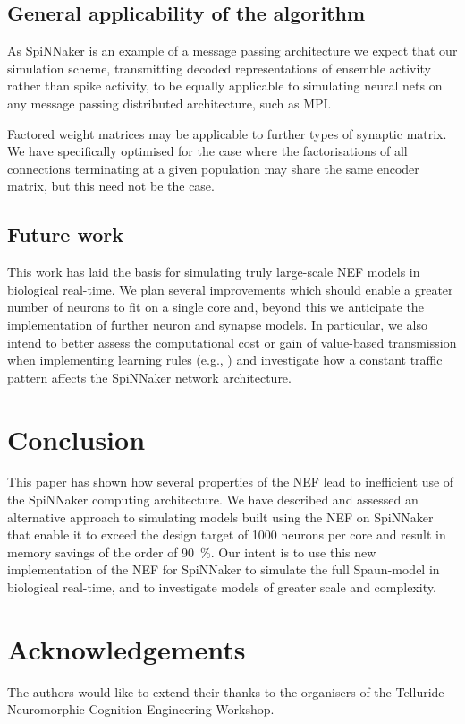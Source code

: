 \documentclass[conference]{IEEEtran}
\begin{document}
  \subsection{General applicability of the algorithm}

  As SpiNNaker is an example of a message passing architecture we expect that our simulation scheme, transmitting decoded representations of ensemble activity rather than spike activity, to be equally applicable to simulating neural nets on any message passing distributed architecture, such as MPI.

  Factored weight matrices may be applicable to further types of synaptic matrix.
  We have specifically optimised for the case where the factorisations of all connections terminating at a given population may share the same encoder matrix, but this need not be the case.

  \subsection{Future work}

  This work has laid the basis for simulating truly large-scale NEF models in biological real-time.
  We plan several improvements which should enable a greater number of neurons to fit on a single core and, beyond this we anticipate the implementation of further neuron and synapse models.
  In particular, we also intend to better assess the computational cost or gain of value-based transmission when implementing learning rules (e.g., \parencite{Voelker2014}) and investigate how a constant traffic pattern affects the SpiNNaker network architecture.

  \section{Conclusion}

  This paper has shown how several properties of the NEF lead to inefficient use of the SpiNNaker computing architecture.
  We have described and assessed an alternative approach to simulating models built using the NEF on SpiNNaker that enable it to exceed the design target of 1000 neurons per core and result in memory savings of the order of \SI{90}{\percent}.
  Our intent is to use this new implementation of the NEF for SpiNNaker to simulate the full Spaun-model in biological real-time, and to investigate models of greater scale and complexity.

  \section*{Acknowledgements}

The authors would like to extend their thanks to the organisers of the Telluride Neuromorphic Cognition Engineering Workshop.

  \printbibliography
\end{document}
